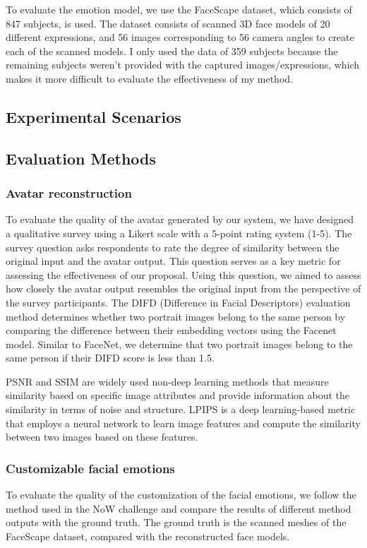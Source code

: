 To evaluate the emotion model, we use the FaceScape dataset, which consists of 847 subjects, is used. The dataset consists of scanned 3D face models of 20 different expressions, and 56 images corresponding to 56 camera angles to create each of the scanned models. I only used the data of 359 subjects because the remaining subjects weren't provided with the captured images/expressions, which makes it more difficult to evaluate the effectiveness of my method.

\subsection{Experimental Scenarios}


\subsection{Evaluation Methods}
\subsubsection{Avatar reconstruction}
To evaluate the quality of the avatar generated by our system, we have designed a qualitative survey using a Likert scale with a 5-point rating system (1-5). The survey question asks respondents to rate the degree of similarity between the original input and the avatar output. This question serves as a key metric for assessing the effectiveness of our proposal.
Using this question, we aimed to assess how closely the avatar output resembles the original input from the perspective of the survey participants.
The DIFD (Difference in Facial Descriptors) evaluation method determines whether two portrait images belong to the same person by comparing the difference between their embedding vectors using the Facenet model. Similar to FaceNet, we determine that two portrait images belong to the same person if their DIFD score is less than 1.5.

PSNR and SSIM are widely used non-deep learning methods that measure similarity based on specific image attributes and provide information about the similarity in terms of noise and structure.
LPIPS is a deep learning-based metric that employs a neural network to learn image features and compute the similarity between two images based on these features.

\subsubsection{Customizable facial emotions}
To evaluate the quality of the customization of the facial emotions, we follow the method used in the NoW challenge and compare the results of different method outputs with the ground truth. The ground truth is the scanned meshes of the FaceScape dataset, compared with the reconstructed face models.

